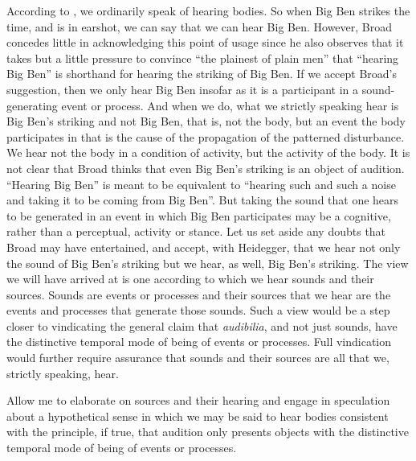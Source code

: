 According to \citet[4]{Broad:1952kx}, we ordinarily speak of hearing bodies. So when Big Ben strikes the time, and is in earshot, we can say that we can hear Big Ben. However, Broad concedes little in acknowledging this point of usage since he also observes that it takes but a little pressure to convince ``the plainest of plain men'' that ``hearing Big Ben'' is shorthand for hearing the striking of Big Ben. If we accept Broad's suggestion, then we only hear Big Ben insofar as it is a participant in a sound-generating event or process. And when we do, what we strictly speaking hear is Big Ben's striking and not Big Ben, that is, not the body, but an event the body participates in that is the cause of the propagation of the patterned disturbance. We hear not the body in a condition of activity, but the activity of the body. It is not clear that Broad thinks that even Big Ben's striking is an object of audition. ``Hearing Big Ben'' is meant to be equivalent to ``hearing such and such a noise and taking it to be coming from Big Ben''. But taking the sound that one hears to be generated in an event in which Big Ben participates may be a cognitive, rather than a perceptual, activity or stance. Let us set aside any doubts that Broad may have entertained, and accept, with Heidegger, that we hear not only the sound of Big Ben's striking but we hear, as well, Big Ben's striking. The view we will have arrived at is one according to which we hear sounds and their sources. Sounds are events or processes and their sources that we hear are the events and processes that generate those sounds. Such a view would be a step closer to vindicating the general claim that \emph{audibilia}, and not just sounds, have the distinctive temporal mode of being of events or processes. Full vindication would further require assurance that sounds and their sources are all that we, strictly speaking, hear.

Allow me to elaborate on sources and their hearing and engage in speculation about a hypothetical sense in which we may be said to hear bodies consistent with the principle, if true, that audition only presents objects with the distinctive temporal mode of being of events or processes.

